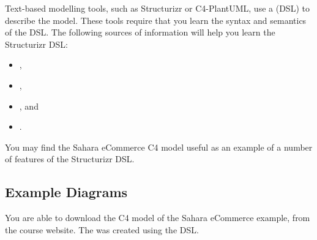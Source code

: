 Text-based modelling tools, such as Structurizr or C4-PlantUML, use a
 (DSL) to describe the model.
These tools require that you learn the syntax and semantics of the DSL.
The following sources of information will help you learn the Structurizr DSL:
\begin{itemize}[nosep]
    \item {},
    \item {}, 
    \item {}, and
    \item {}.
\end{itemize}
You may find the Sahara eCommerce C4 model useful as an example of a number of features of the Structurizr DSL.

\subsection{Example Diagrams}
You are able to download the C4 model of the Sahara eCommerce example, from the course website.
The 
was created using the  DSL.
